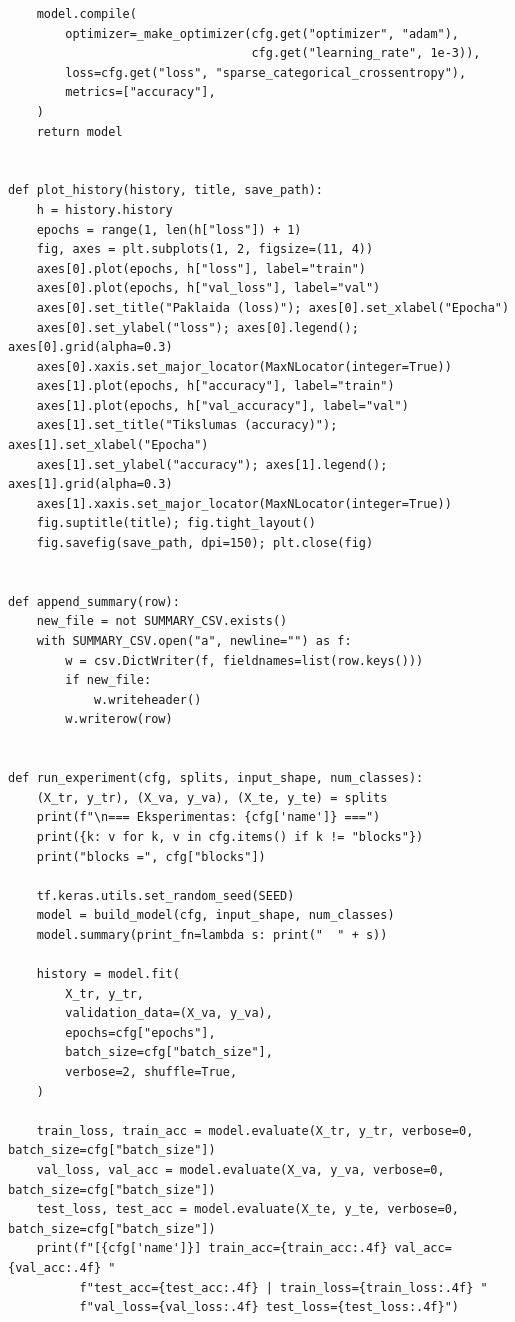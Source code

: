 \documentclass[]{VUMIFTemplateClass}
\begin{document}
\begin{verbatim}
    model.compile(
        optimizer=_make_optimizer(cfg.get("optimizer", "adam"),
                                  cfg.get("learning_rate", 1e-3)),
        loss=cfg.get("loss", "sparse_categorical_crossentropy"),
        metrics=["accuracy"],
    )
    return model


def plot_history(history, title, save_path):
    h = history.history
    epochs = range(1, len(h["loss"]) + 1)
    fig, axes = plt.subplots(1, 2, figsize=(11, 4))
    axes[0].plot(epochs, h["loss"], label="train")
    axes[0].plot(epochs, h["val_loss"], label="val")
    axes[0].set_title("Paklaida (loss)"); axes[0].set_xlabel("Epocha")
    axes[0].set_ylabel("loss"); axes[0].legend(); axes[0].grid(alpha=0.3)
    axes[0].xaxis.set_major_locator(MaxNLocator(integer=True))
    axes[1].plot(epochs, h["accuracy"], label="train")
    axes[1].plot(epochs, h["val_accuracy"], label="val")
    axes[1].set_title("Tikslumas (accuracy)"); axes[1].set_xlabel("Epocha")
    axes[1].set_ylabel("accuracy"); axes[1].legend(); axes[1].grid(alpha=0.3)
    axes[1].xaxis.set_major_locator(MaxNLocator(integer=True))
    fig.suptitle(title); fig.tight_layout()
    fig.savefig(save_path, dpi=150); plt.close(fig)


def append_summary(row):
    new_file = not SUMMARY_CSV.exists()
    with SUMMARY_CSV.open("a", newline="") as f:
        w = csv.DictWriter(f, fieldnames=list(row.keys()))
        if new_file:
            w.writeheader()
        w.writerow(row)


def run_experiment(cfg, splits, input_shape, num_classes):
    (X_tr, y_tr), (X_va, y_va), (X_te, y_te) = splits
    print(f"\n=== Eksperimentas: {cfg['name']} ===")
    print({k: v for k, v in cfg.items() if k != "blocks"})
    print("blocks =", cfg["blocks"])

    tf.keras.utils.set_random_seed(SEED)
    model = build_model(cfg, input_shape, num_classes)
    model.summary(print_fn=lambda s: print("  " + s))

    history = model.fit(
        X_tr, y_tr,
        validation_data=(X_va, y_va),
        epochs=cfg["epochs"],
        batch_size=cfg["batch_size"],
        verbose=2, shuffle=True,
    )

    train_loss, train_acc = model.evaluate(X_tr, y_tr, verbose=0, batch_size=cfg["batch_size"])
    val_loss, val_acc = model.evaluate(X_va, y_va, verbose=0, batch_size=cfg["batch_size"])
    test_loss, test_acc = model.evaluate(X_te, y_te, verbose=0, batch_size=cfg["batch_size"])
    print(f"[{cfg['name']}] train_acc={train_acc:.4f} val_acc={val_acc:.4f} "
          f"test_acc={test_acc:.4f} | train_loss={train_loss:.4f} "
          f"val_loss={val_loss:.4f} test_loss={test_loss:.4f}")


\end{verbatim}
\end{document}
